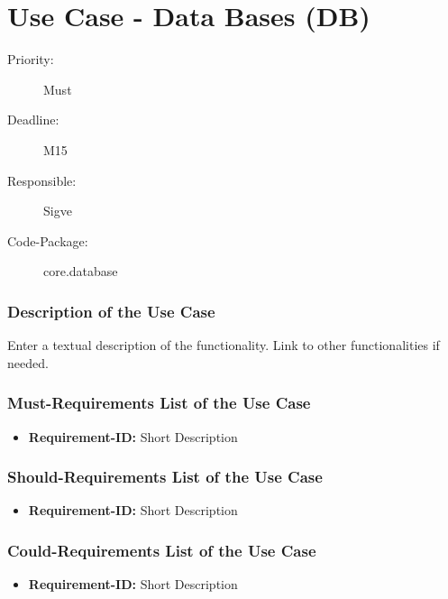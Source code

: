 \section{Use Case - Data Bases (DB)}
\label{UseCase:DB}

\begin{description}
\item[Priority:] Must
\item[Deadline:] M15
\item[Responsible:] Sigve
\item[Code-Package:] core.database
\end{description}

\subsubsection*{Description of the Use Case}

Enter a textual description of the functionality. Link to other functionalities if needed. 


\subsubsection*{Must-Requirements List of the Use Case}

\begin{itemize}
\item \textbf{Requirement-ID:} Short Description
\end{itemize}

\subsubsection*{Should-Requirements List of the Use Case}

\begin{itemize}
\item \textbf{Requirement-ID:} Short Description
\end{itemize}

\subsubsection*{Could-Requirements List of the Use Case}

\begin{itemize}
\item \textbf{Requirement-ID:} Short Description
\end{itemize}


